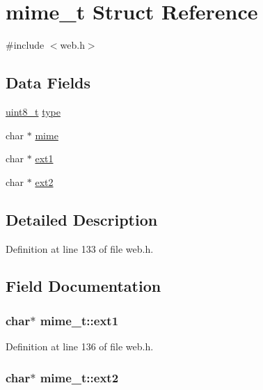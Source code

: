 \hypertarget{structmime__t}{}\section{mime\+\_\+t Struct Reference}
\label{structmime__t}


{\ttfamily \#include $<$web.\+h$>$}

\subsection*{Data Fields}
\begin{DoxyCompactItemize}
\item 
\hyperlink{send_8c_aba7bc1797add20fe3efdf37ced1182c5}{uint8\+\_\+t} \hyperlink{structmime__t_ae69826dcfd475d65fa0fe8a1574bb3af}{type}
\item 
char $\ast$ \hyperlink{structmime__t_ad796d16eaee60d7435bff66b2e9b8a8d}{mime}
\item 
char $\ast$ \hyperlink{structmime__t_a22af12abb536a48d3425a3a4d1cce2a4}{ext1}
\item 
char $\ast$ \hyperlink{structmime__t_ae16e9342ecd4df97a2564658f1f506b1}{ext2}
\end{DoxyCompactItemize}


\subsection{Detailed Description}


Definition at line 133 of file web.\+h.



\subsection{Field Documentation}
\subsubsection[{\texorpdfstring{ext1}{ext1}}]{\setlength{\rightskip}{0pt plus 5cm}char$\ast$ mime\+\_\+t\+::ext1}\hypertarget{structmime__t_a22af12abb536a48d3425a3a4d1cce2a4}{}\label{structmime__t_a22af12abb536a48d3425a3a4d1cce2a4}


Definition at line 136 of file web.\+h.

\subsubsection[{\texorpdfstring{ext2}{ext2}}]{\setlength{\rightskip}{0pt plus 5cm}char$\ast$ mime\+\_\+t\+::ext2}\hypertarget{structmime__t_ae16e9342ecd4df97a2564658f1f506b1}{}\label{structmime__t_ae16e9342ecd4df97a2564658f1f506b1}


